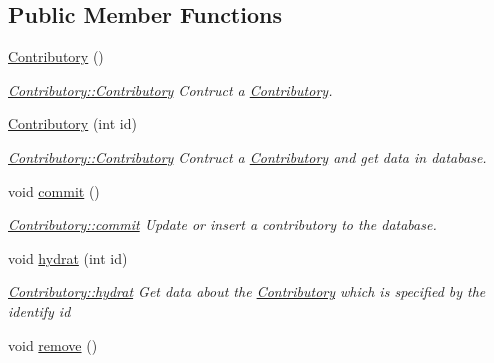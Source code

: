 \subsection*{Public Member Functions}
\begin{DoxyCompactItemize}
\item 
\hypertarget{classContributory_a5991c01efd2dedcbbddde252c48d7af8}{\hyperlink{classContributory_a5991c01efd2dedcbbddde252c48d7af8}{Contributory} ()}\label{classContributory_a5991c01efd2dedcbbddde252c48d7af8}

\begin{DoxyCompactList}\small\item\em \hyperlink{classContributory_a5991c01efd2dedcbbddde252c48d7af8}{Contributory\+::\+Contributory} Contruct a \hyperlink{classContributory}{Contributory}. \end{DoxyCompactList}\item 
\hyperlink{classContributory_a5c72cf02d2c6d25ee736af711edd76ec}{Contributory} (int id)
\begin{DoxyCompactList}\small\item\em \hyperlink{classContributory_a5991c01efd2dedcbbddde252c48d7af8}{Contributory\+::\+Contributory} Contruct a \hyperlink{classContributory}{Contributory} and get data in database. \end{DoxyCompactList}\item 
\hypertarget{classContributory_a5c09902237bba780b594129dc2fa60d6}{void \hyperlink{classContributory_a5c09902237bba780b594129dc2fa60d6}{commit} ()}\label{classContributory_a5c09902237bba780b594129dc2fa60d6}

\begin{DoxyCompactList}\small\item\em \hyperlink{classContributory_a5c09902237bba780b594129dc2fa60d6}{Contributory\+::commit} Update or insert a contributory to the database. \end{DoxyCompactList}\item 
void \hyperlink{classContributory_a2b834e0288c93ba9ed70acf7a0b8c32d}{hydrat} (int id)
\begin{DoxyCompactList}\small\item\em \hyperlink{classContributory_a2b834e0288c93ba9ed70acf7a0b8c32d}{Contributory\+::hydrat} Get data about the \hyperlink{classContributory}{Contributory} which is specified by the identify {\itshape id} \end{DoxyCompactList}\item 
\hypertarget{classContributory_a59641dbc35947c31eb841b46fed6130f}{void \hyperlink{classContributory_a59641dbc35947c31eb841b46fed6130f}{remove} ()}\label{classContributory_a59641dbc35947c31eb841b46fed6130f}


\end{DoxyCompactItemize}

